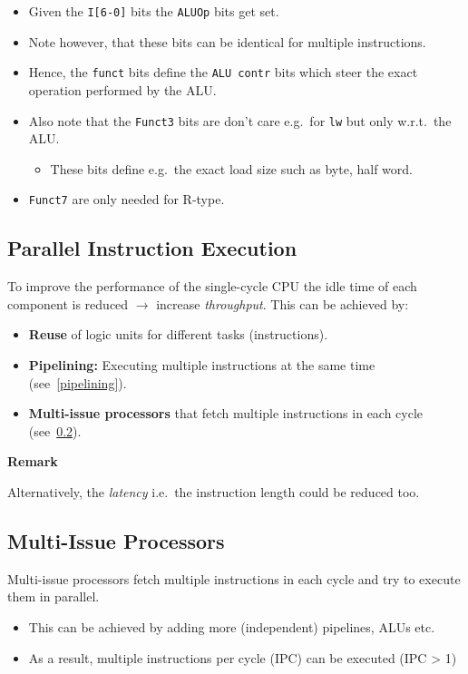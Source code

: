 \newpar{}
\begin{itemize}
    \item Given the \texttt{I[6-0]} bits the \texttt{ALUOp} bits get set.
    \item Note however, that these bits can be identical for multiple instructions.
    \item Hence, the \texttt{funct} bits define the \texttt{ALU contr} bits which steer the exact operation performed by the ALU.
    \item Also note that the \texttt{Funct3} bits are don't care e.g.\ for \texttt{lw} but only w.r.t.\ the ALU.
    \begin{itemize}
        \item These bits define e.g.\ the exact load size such as byte, half word.
    \end{itemize}
    \item \texttt{Funct7} are only needed for R-type.
\end{itemize}

\subsection{Parallel Instruction Execution}

To improve the performance of the single-cycle CPU the idle time of each component is reduced  $\to$ increase \textit{throughput}. This can be achieved by:

\begin{itemize}
    \item \textbf{Reuse} of logic units for different tasks (instructions).
    \item \textbf{Pipelining:} Executing multiple instructions at the same time (see~\ref{pipelining}).
    \item \textbf{Multi-issue processors} that fetch multiple instructions in each cycle (see~\ref{multi-issue processors}).
\end{itemize}

\textbf{Remark}

Alternatively, the \textit{latency} i.e.\ the instruction length could be reduced too.

\subsection{Multi-Issue Processors}\label{multi-issue processors}
Multi-issue processors fetch multiple instructions in each cycle and try to execute them in parallel.
\begin{itemize}
    \item This can be achieved by adding more (independent) pipelines, ALUs etc.
    \item As a result, multiple instructions per cycle (IPC) can be executed (IPC > 1)
\end{itemize}

